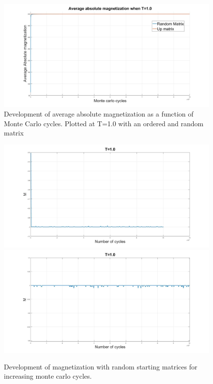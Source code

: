 \documentclass[10pt,a4paper]{article}
\begin{document}
\begin{figure} [H]
\centerline{
\includegraphics[scale=0.3]{avgMagn1.jpg}
}
\caption{Development of average absolute magnetization as a function of Monte Carlo cycles. Plotted at T=1.0 with an ordered and random matrix}
\label{fig:AverageMagn1}
\end{figure}

\begin{figure} [H]
\centerline{
\includegraphics[scale=0.15]{RANDOMmag1notabs.jpg}
\includegraphics[scale=0.15]{UPmag1notabs.jpg}
}
\caption{Development of magnetization with random starting matrices for increasing monte carlo cycles.}
\label{fig:RandomMagNotAbs}
\end{figure}
\end{document}

